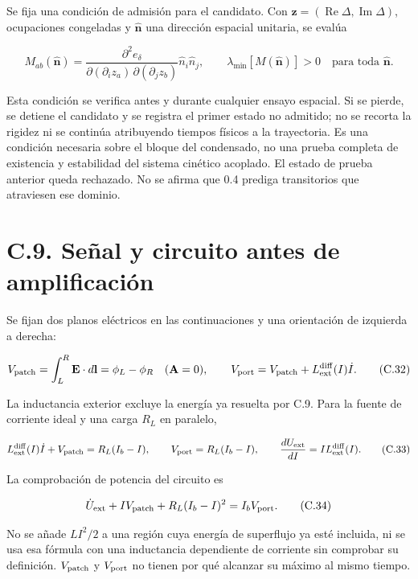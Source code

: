 \documentclass[
  spanish,
  10pt,
  a4paper,
]{article}
\begin{document}
Se fija una condición de admisión para el candidato. Con
\(\mathbf z=(\operatorname{Re}\Delta,\operatorname{Im}\Delta)\),
ocupaciones congeladas y \(\widehat{\mathbf n}\) una dirección espacial
unitaria, se evalúa

\[
M_{ab}(\widehat{\mathbf n})
=\frac{\partial^2 e_\delta}{\partial(\partial_i z_a)\,\partial(\partial_j z_b)}
\widehat n_i\widehat n_j,
\qquad \lambda_{\min}[M(\widehat{\mathbf n})]>0
\quad\text{para toda }\widehat{\mathbf n}.
\]

Esta condición se verifica antes y durante cualquier ensayo espacial. Si
se pierde, se detiene el candidato y se registra el primer estado no
admitido; no se recorta la rigidez ni se continúa atribuyendo tiempos
físicos a la trayectoria. Es una condición necesaria sobre el bloque del
condensado, no una prueba completa de existencia y estabilidad del
sistema cinético acoplado. El estado de prueba anterior queda rechazado.
No se afirma que 0.4 prediga transitorios que atraviesen ese dominio.

\section{C.9. Señal y circuito antes de
amplificación}\label{c.9.-seuxf1al-y-circuito-antes-de-amplificaciuxf3n}

Se fijan dos planos eléctricos en las continuaciones y una orientación
de izquierda a derecha:

\[
V_{\rm patch}=\int_L^R\mathbf E\cdot d\mathbf l
=\phi_L-\phi_R\quad(\mathbf A=0),\qquad
V_{\rm port}=V_{\rm patch}+L_{\rm ext}^{\rm diff}(I)\dot I.
\tag{C.32}
\]

La inductancia exterior excluye la energía ya resuelta por C.9. Para la
fuente de corriente ideal y una carga \(R_L\) en paralelo,

\[
L_{\rm ext}^{\rm diff}(I)\dot I+V_{\rm patch}=R_L(I_b-I),
\qquad V_{\rm port}=R_L(I_b-I),\qquad
\frac{dU_{\rm ext}}{dI}=I L_{\rm ext}^{\rm diff}(I).
\tag{C.33}
\]

La comprobación de potencia del circuito es

\[
\dot U_{\rm ext}+I V_{\rm patch}+R_L(I_b-I)^2=I_bV_{\rm port}.
\tag{C.34}
\]

No se añade \(LI^2/2\) a una región cuya energía de superflujo ya esté
incluida, ni se usa esa fórmula con una inductancia dependiente de
corriente sin comprobar su definición. \(V_{\rm patch}\) y
\(V_{\rm port}\) no tienen por qué alcanzar su máximo al mismo tiempo.
\end{document}
